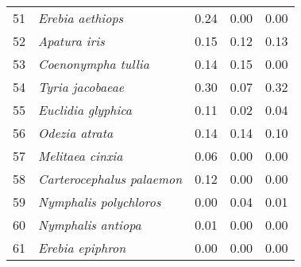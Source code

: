 \begin{table}[h]
\begin{tabular}{rllll}
51 & \textit{Erebia aethiops} & 0.24 & 0.00 & 0.00 \\
52 & \textit{Apatura iris} & 0.15 & 0.12 & 0.13 \\
53 & \textit{Coenonympha tullia} & 0.14 & 0.15 & 0.00 \\
54 & \textit{Tyria jacobaeae} & 0.30 & 0.07 & 0.32 \\
55 & \textit{Euclidia glyphica} & 0.11 & 0.02 & 0.04 \\
56 & \textit{Odezia atrata} & 0.14 & 0.14 & 0.10 \\
57 & \textit{Melitaea cinxia} & 0.06 & 0.00 & 0.00 \\
58 & \textit{Carterocephalus palaemon} & 0.12 & 0.00 & 0.00 \\
59 & \textit{Nymphalis polychloros} & 0.00 & 0.04 & 0.01 \\
60 & \textit{Nymphalis antiopa} & 0.01 & 0.00 & 0.00 \\
61 & \textit{Erebia epiphron} & 0.00 & 0.00 & 0.00 \\
\bottomrule
\end{tabular}
\end{table}
